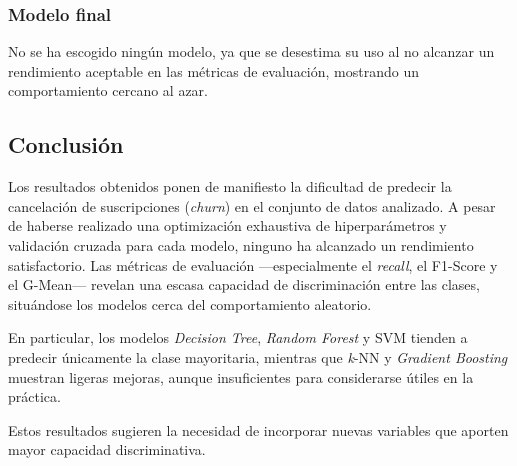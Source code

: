 
\subsubsection{Modelo final}

No se ha escogido ningún modelo, ya que se desestima su uso al no alcanzar un rendimiento aceptable en las métricas de evaluación, mostrando un comportamiento cercano al azar.




\subsection{Conclusión}

Los resultados obtenidos ponen de manifiesto la dificultad de predecir la cancelación de suscripciones (\textit{churn}) en el conjunto de datos analizado. A pesar de haberse realizado una optimización exhaustiva de hiperparámetros y validación cruzada para cada modelo, ninguno ha alcanzado un rendimiento satisfactorio. Las métricas de evaluación ---especialmente el \textit{recall}, el F1-Score y el G-Mean--- revelan una escasa capacidad de discriminación entre las clases, situándose los modelos cerca del comportamiento aleatorio.

En particular, los modelos \textit{Decision Tree}, \textit{Random Forest} y SVM tienden a predecir únicamente la clase mayoritaria, mientras que \textit{k}-NN y \textit{Gradient Boosting} muestran ligeras mejoras, aunque insuficientes para considerarse útiles en la práctica.

Estos resultados sugieren la necesidad de incorporar nuevas variables que aporten mayor capacidad discriminativa. 


